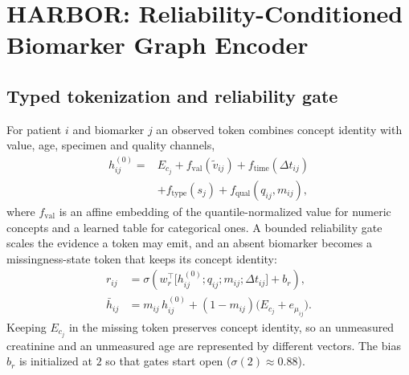 \section{HARBOR: Reliability-Conditioned Biomarker Graph Encoder}\label{sec:harbor}
\subsection{Typed tokenization and reliability gate}
For patient $i$ and biomarker $j$ an observed token combines concept identity with value, age, specimen and quality channels,
\begin{equation}
\begin{aligned}
h^{(0)}_{ij}={}&E_{c_j}+f_{\mathrm{val}}(\tilde v_{ij})+f_{\mathrm{time}}(\Delta t_{ij})\\
&+f_{\mathrm{type}}(s_j)+f_{\mathrm{qual}}(q_{ij},m_{ij}),
\end{aligned}
\end{equation}
where $f_{\mathrm{val}}$ is an affine embedding of the quantile-normalized value for numeric concepts and a learned table for categorical ones. A bounded reliability gate scales the evidence a token may emit, and an absent biomarker becomes a missingness-state token that keeps its concept identity:
\begin{equation}\label{eq:gate}
\begin{aligned}
r_{ij}&=\sigma\!\left(w_r^{\top}\big[h^{(0)}_{ij};q_{ij};m_{ij};\Delta t_{ij}\big]+b_r\right),\\
\bar h_{ij}&=m_{ij}\,h^{(0)}_{ij}+(1-m_{ij})\big(E_{c_j}+e_{\mu_{ij}}\big).
\end{aligned}
\end{equation}
Keeping $E_{c_j}$ in the missing token preserves concept identity, so an unmeasured creatinine and an unmeasured age are represented by different vectors. The bias $b_r$ is initialized at $2$ so that gates start open ($\sigma(2)\approx0.88$).

